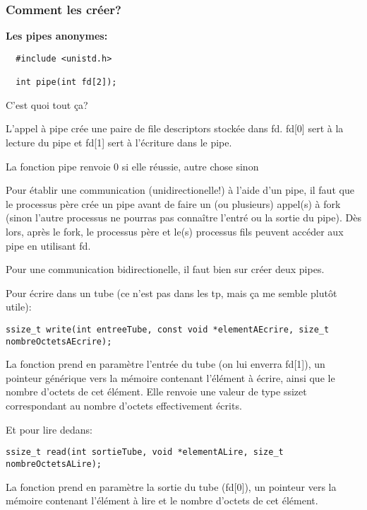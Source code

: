 \documentclass[a4paper]{article}
\begin{document}
\subsubsection{Comment les créer?}
\textbf{Les pipes anonymes:}
\begin{lstlisting}
  #include <unistd.h>

  int pipe(int fd[2]);
\end{lstlisting}
C'est quoi tout ça?\newline
\begin{description}
  \item L'appel à pipe crée une paire de \guillemotleft{}file descriptors\guillemotright{} stockée dans fd.\newline
           fd[0] sert à la lecture du pipe et fd[1] sert à l'écriture dans le pipe.
  \item La fonction pipe renvoie 0 si elle réussie, autre chose sinon
  \item Pour établir une communication (unidirectionelle!) à l'aide d'un pipe, il faut que le processus père crée un pipe avant de faire un (ou plusieurs) appel(s) à fork (sinon l'autre processus ne pourras pas connaître l'entré ou la sortie du pipe). Dès lors, après le fork, le processus père et le(s) processus fils peuvent accéder aux pipe en utilisant fd.
  \item Pour une communication bidirectionelle, il faut bien sur créer deux pipes.
\end{description}
Pour écrire dans un tube (ce n'est pas dans les tp, mais ça me semble plutôt utile):
\begin{lstlisting}
ssize_t write(int entreeTube, const void *elementAEcrire, size_t nombreOctetsAEcrire);
\end{lstlisting}
La fonction prend en paramètre l'entrée du tube (on lui enverra fd[1]), un pointeur générique vers la mémoire contenant l'élément à écrire, ainsi que le nombre d'octets de cet élément.\newline
Elle renvoie une valeur de type ssize\textunderscore{}t correspondant au nombre d'octets effectivement écrits.\par
Et pour lire dedans:
\begin{lstlisting}
ssize_t read(int sortieTube, void *elementALire, size_t nombreOctetsALire);
\end{lstlisting}
La fonction prend en paramètre la sortie du tube (fd[0]), un pointeur vers la mémoire contenant l'élément à lire et le nombre d'octets de cet élément.\newline
\end{document}
